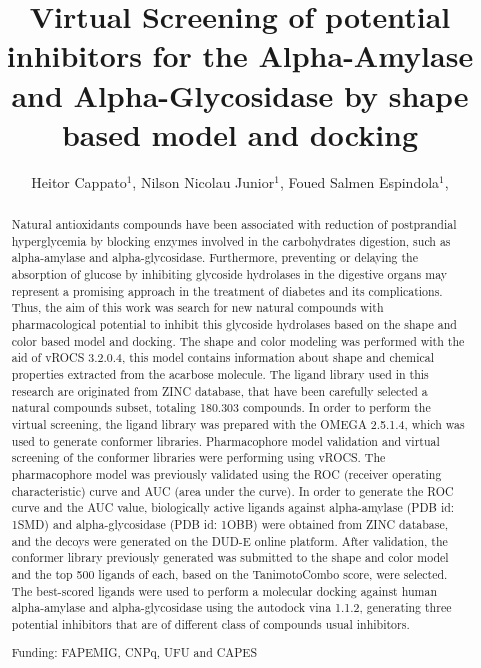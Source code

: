\documentclass[twoside]{article}
\title{\vspace{-15mm}\fontsize{24pt}{10pt}\selectfont\textbf{ Virtual Screening of potential inhibitors for the Alpha-Amylase and Alpha-Glycosidase by shape based model and docking }} %
\author{ Heitor Cappato$^{1}$, Nilson Nicolau Junior$^{1}$, Foued Salmen Espindola$^{1}$, }
\affil{ 1 UFU

 }
\date{}
\begin{document}
  
  
  \maketitle %
  
  
  \thispagestyle{fancy} %
  
  
  \begin{abstract}
  Natural antioxidants compounds have been associated with reduction of postprandial hyperglycemia by blocking enzymes involved in the carbohydrates digestion, such as alpha-amylase and alpha-glycosidase. Furthermore, preventing or delaying the absorption of glucose by inhibiting glycoside hydrolases in the digestive organs may represent a promising approach in the treatment of diabetes and its complications. Thus, the aim of this work was search for new natural compounds with pharmacological potential to inhibit this glycoside hydrolases based on the shape and color based model and docking. The shape and color modeling was performed with the aid of vROCS 3.2.0.4, this model contains information about shape and chemical properties extracted from the acarbose molecule. The ligand library used in this research are originated from ZINC database, that have been carefully selected a natural compounds subset, totaling 180.303 compounds. In order to perform the virtual screening, the ligand library was prepared with the OMEGA 2.5.1.4, which was used to generate conformer libraries. Pharmacophore model validation and virtual screening of the conformer libraries were performing using vROCS. The pharmacophore model was previously validated using the ROC (receiver operating characteristic) curve and AUC (area under the curve). In order to generate the ROC curve and the AUC value, biologically active ligands against alpha-amylase (PDB id: 1SMD) and alpha-glycosidase (PDB id: 1OBB) were obtained from ZINC database, and the decoys were generated on the DUD-E online platform. After validation, the conformer library previously generated was submitted to the shape and color model and the top 500 ligands of each, based on the TanimotoCombo score, were selected. The best-scored ligands were used to perform a molecular docking against human alpha-amylase and alpha-glycosidase using the autodock vina 1.1.2, generating three potential inhibitors that are of different class of compounds usual inhibitors.
  
  Funding: FAPEMIG, CNPq, UFU and CAPES \\ 
  \end{abstract}
  
\end{document}
